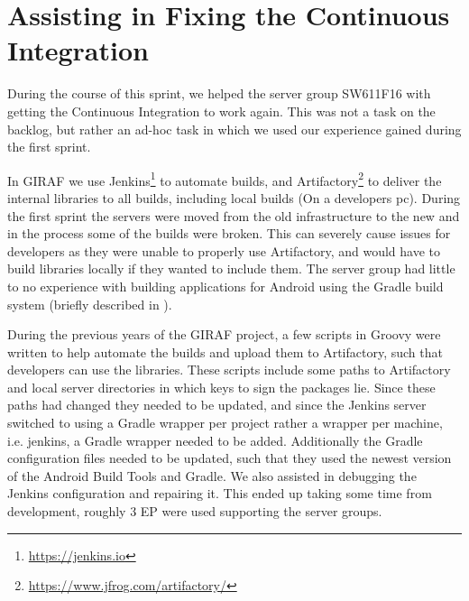 \section{Assisting in Fixing the Continuous Integration}
During the course of this sprint, we helped the server group SW611F16 with getting the Continuous Integration  to work again. 
This was not a task on the backlog, but rather an ad-hoc task in which we used our experience gained during the first sprint.  

In GIRAF we use Jenkins\footnote{\url{https://jenkins.io}} to automate builds, and Artifactory\footnote{\url{https://www.jfrog.com/artifactory/}} to deliver the internal libraries to all builds, including local builds (On a developers pc). 
During the first sprint the servers were moved from the old infrastructure to the new and in the process some of the builds were broken. 
This can severely cause issues for developers as they were unable to properly use Artifactory, and would have to build libraries locally if they wanted to include them.
The server group had little to no experience with building applications for Android using the Gradle build system (briefly described in ). 

During the previous years of the GIRAF project, a few scripts in Groovy were written to help automate the builds and upload them to Artifactory, such that developers can use the libraries.
These scripts include some paths to Artifactory and local server directories in which keys to sign the packages lie. 
Since these paths had changed they needed to be updated, and since the Jenkins server switched to using a Gradle wrapper per project rather a wrapper per machine, i.e. jenkins, a Gradle wrapper needed to be added.
Additionally the Gradle configuration files needed to be updated, such that they used the newest version of the Android Build Tools and Gradle. 
We also assisted in debugging the Jenkins configuration and repairing it. 
This ended up taking some time from development, roughly 3 EP were used supporting the server groups.
